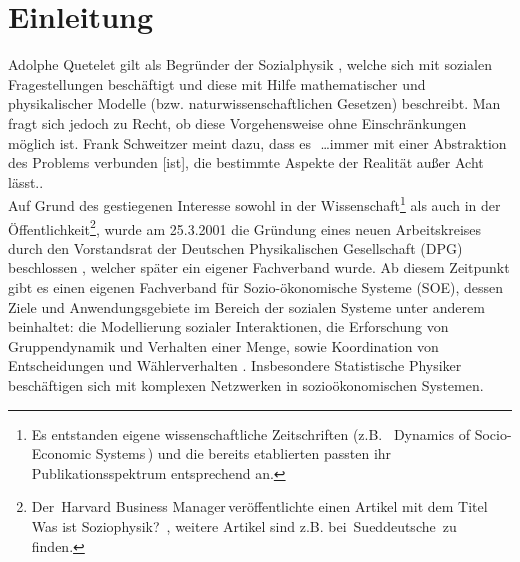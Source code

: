 \documentclass[fontsize=11pt, twoside, a4paper]{scrartcl}
\renewcommand{\headrulewidth}{0pt} %
\begin{document}
\newpage
\begin{verbatim}

\end{verbatim}
\newpage
{}
\pagestyle{fancy}
\renewcommand{\headrulewidth}{0.5pt}
\section{Einleitung}
\label{sec:St8}
Adolphe Quetelet gilt als Begründer der Sozialphysik \cite{AdolpheQuetelet}, welche sich mit sozialen Fragestellungen beschäftigt und diese mit Hilfe mathematischer und physikalischer Modelle (bzw. naturwissenschaftlichen Gesetzen) beschreibt. Man fragt sich jedoch zu Recht, ob diese Vorgehensweise ohne Einschränkungen möglich ist. Frank Schweitzer meint dazu, dass es\, \glqq \,\ldots immer mit einer Abstraktion des Problems verbunden [ist], die bestimmte Aspekte der Realität außer Acht lässt.\grqq \cite{FrankSchweitzer}.\\
Auf Grund des gestiegenen Interesse sowohl in der Wissenschaft\footnote{Es entstanden eigene wissenschaftliche Zeitschriften (z.B. \, \glqq Dynamics of Socio-Economic Systems\grqq\,) und  die bereits etablierten passten ihr Publikationsspektrum entsprechend an.} als auch in der Öffentlichkeit\footnote{Der \,\glqq Harvard Business Manager\grqq\,veröffentlichte einen Artikel mit dem Titel \, \glqq Was ist Soziophysik?\grqq\, , weitere Artikel sind z.B. bei \,\glqq Sueddeutsche\grqq\, zu finden.}, wurde am 25.3.2001 die Gründung eines neuen Arbeitskreises durch den Vorstandsrat der Deutschen Physikalischen Gesellschaft (DPG) beschlossen \cite{GruendungSOE}, welcher später ein eigener Fachverband wurde.
Ab diesem Zeitpunkt gibt es einen eigenen Fachverband für Sozio-ökonomische Systeme (SOE), dessen Ziele und Anwendungsgebiete im Bereich der sozialen Systeme unter anderem beinhaltet: die Modellierung sozialer Interaktionen, die Erforschung von Gruppendynamik und Verhalten einer Menge, sowie Koordination von Entscheidungen und Wählerverhalten \cite{SOE}. Insbesondere Statistische Physiker beschäftigen sich mit komplexen Netzwerken in sozioökonomischen Systemen.\\
\end{document}
